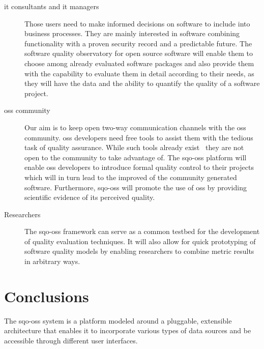 \documentclass{llncs}
\begin{document}
\begin{description}
	\item [{\sc it} consultants and {\sc it} managers] Those users need to make 
	informed decisions on software to include into business processes. They are 
	mainly interested in software combining functionality with a proven security 
	record and a predictable future.
The software quality observatory for open source software will enable them 
	to choose among already evaluated software packages and also provide them with 
	the capability to evaluate them in detail according to their needs, as they 
	will have the data and the ability to quantify the quality of a software 
	project.  

	\item [{\sc oss} community] Our aim is to keep
	 open two-way communication channels with the {\sc oss} community. {\sc oss} 
	developers need free tools to assist them with the tedious task of quality 
	assurance. While such tools already exist~\cite{HACK05,SKIB07} they are not 
	open to the community to take advantage of. The {\sc sqo-oss} platform will 
	enable {\sc oss} developers to introduce formal quality control to their 
	projects which will in turn lead to the improved of the community generated 
	software. Furthermore, {\sc sqo-oss} will promote the use of {\sc oss} by 
	providing scientific evidence of its perceived quality.
	
	\item [Researchers] The {\sc sqo-oss} framework can serve as a common testbed 
	for the development of quality evaluation techniques. It will also allow for
	quick prototyping of software quality models by enabling researchers to 
	combine metric results in arbitrary ways.
\end{description}

\section{Conclusions} %
\label{sec:conclusions}

The {\sc sqo-oss} system is a platform modeled 
around a pluggable, extensible architecture that enables it to incorporate 
various types of data sources and be accessible through different user interfaces.
\end{document}
